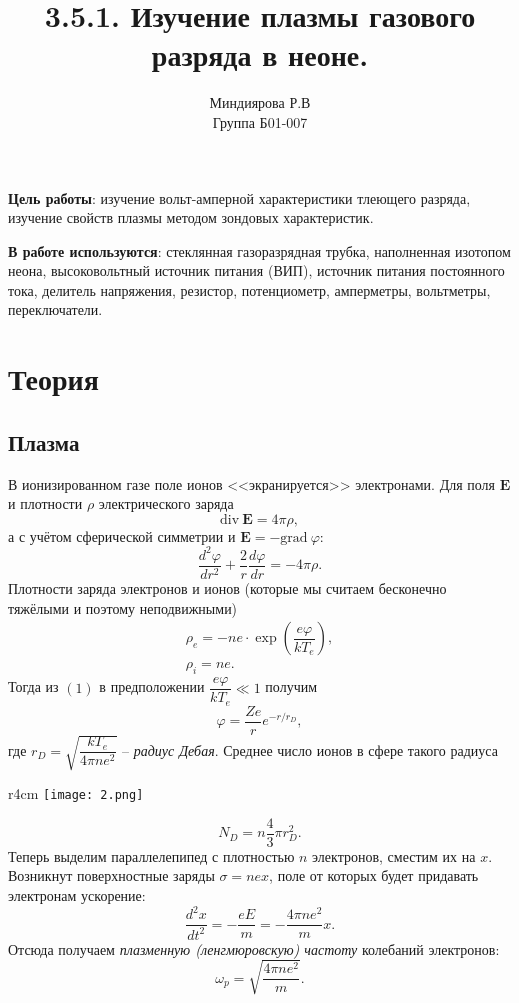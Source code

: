 \documentclass[a4paper,12pt]{article}
\author{Миндиярова Р.В\\
Группа Б01-007}
\title{3.5.1. Изучение плазмы газового разряда в неоне.}
\date{}
\begin{document}
\maketitle
\textbf{Цель работы}: изучение вольт-амперной характеристики тлеющего разряда, изучение свойств плазмы методом зондовых характеристик.


\textbf{В работе используются}: стеклянная газоразрядная трубка, наполненная изотопом неона, высоковольтный источник питания (ВИП), источник питания постоянного тока, делитель напряжения, резистор, потенциометр, амперметры, вольтметры, переключатели.
\section*{Теория}
\subsection*{Плазма}
В ионизированном газе поле ионов <<экранируется>> электронами. Для поля $\mathbf{E}$ и плотности $\rho$ электрического заряда
$$
\text{div}~\mathbf{E} = 4 \pi \rho,
$$
а с учётом сферической симметрии и $\mathbf{E} = -\text{grad}~\varphi$:
\begin{equation}
\dfrac{d^2 \varphi}{dr^2}+\dfrac{2}{r}\dfrac{d\varphi}{dr}=-4\pi \rho.
\end{equation}
Плотности заряда электронов и ионов (которые мы считаем бесконечно тяжёлыми и поэтому неподвижными)
\begin{equation}
\begin{array}{c}
\rho_e = -ne \cdot \exp\left(\dfrac{e\varphi}{kT_e}\right),\\
\rho_i = ne.
\end{array}
\end{equation}
Тогда из $(1)$ в предположении $\dfrac{e\varphi}{kT_e} \ll 1$ получим
\begin{equation}
\varphi = \dfrac{Ze}{r}e^{-r/r_D},
\end{equation}
где $r_D = \sqrt{\dfrac{kT_e}{4\pi n e^2}}$ -- \textit{радиус Дебая}. Среднее число ионов в сфере такого радиуса 
\begin{wrapfigure}{r}{4cm}
\texttt{[image: 2.png]}
\end{wrapfigure}  
\begin{equation}
N_D = n\dfrac{4}{3}\pi r_D^2.
\end{equation}
Теперь выделим параллелепипед с плотностью $n$ электронов, сместим их на $x$. Возникнут поверхностные заряды $\sigma = nex$, поле от которых будет придавать электронам ускорение:
$$
\dfrac{d^2x}{dt^2}=-\dfrac{eE}{m}=-\dfrac{4\pi n e^2}{m}x.
$$ 
Отсюда получаем \textit{плазменную (ленгмюровскую) частоту} колебаний электронов:
\begin{equation}
\omega_p = \sqrt{\dfrac{4\pi ne^2}{m}}.
\end{equation}
\end{document}

